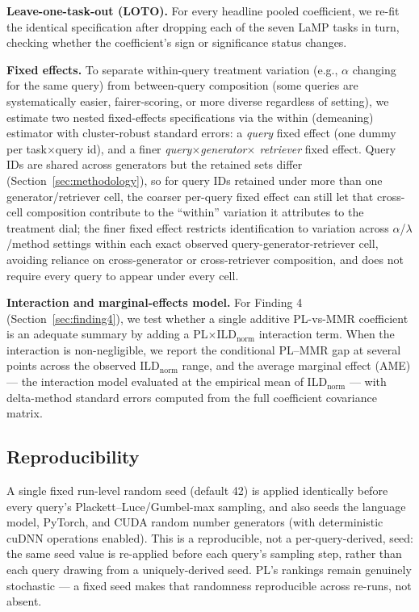 \documentclass[11pt]{article}
\newcommand{\ild}{\ensuremath{\mathrm{ILD}}}
\newcommand{\ildnorm}{\ensuremath{\ild_{\mathrm{norm}}}}
\begin{document}
\textbf{Leave-one-task-out (LOTO).} For every headline pooled coefficient,
we re-fit the identical specification after dropping each of the seven
LaMP tasks in turn, checking whether the coefficient's sign or
significance status changes.

\textbf{Fixed effects.} To separate within-query treatment variation
(e.g., $\alpha$ changing for the same query) from between-query
composition (some queries are systematically easier, fairer-scoring, or
more diverse regardless of setting), we estimate two nested fixed-effects
specifications via the within (demeaning) estimator with cluster-robust
standard errors: a \emph{query} fixed effect (one dummy per
task$\times$query id), and a finer \emph{query$\times$generator$\times$
retriever} fixed effect. Query IDs are shared across generators but the
retained sets differ (Section~\ref{sec:methodology}), so for query IDs
retained under more than one generator/retriever cell, the coarser
per-query fixed effect can still let that cross-cell composition
contribute to the ``within'' variation it attributes to the treatment
dial; the finer fixed effect restricts identification to variation across
$\alpha$/$\lambda$/method settings within each exact observed
query-generator-retriever cell, avoiding reliance on cross-generator or
cross-retriever composition, and does not require every query to appear
under every cell.

\textbf{Interaction and marginal-effects model.} For Finding 4
(Section~\ref{sec:finding4}), we test whether a single additive PL-vs-MMR
coefficient is an adequate summary by adding a PL$\times$\ildnorm{}
interaction term. When the interaction is non-negligible, we report the
conditional PL--MMR gap at several points across the observed \ildnorm{}
range, and the average marginal effect (AME) --- the interaction model
evaluated at the empirical mean of \ildnorm{} --- with delta-method
standard errors computed from the full coefficient covariance matrix.

\subsection{Reproducibility}

A single fixed run-level random seed (default 42) is applied identically
before every query's Plackett--Luce/Gumbel-max sampling, and also seeds
the language model, PyTorch, and CUDA random number generators (with
deterministic cuDNN operations enabled). This is a reproducible, not a
per-query-derived, seed: the same seed value is re-applied before each
query's sampling step, rather than each query drawing from a
uniquely-derived seed. PL's rankings remain genuinely stochastic --- a
fixed seed makes that randomness reproducible across re-runs, not absent.
\end{document}
